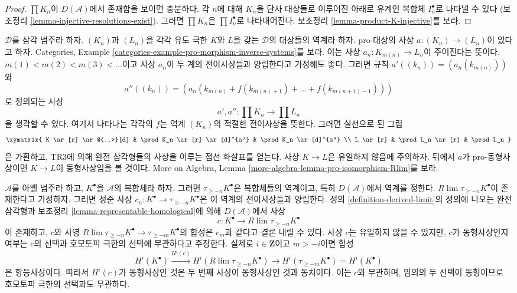 \begin{proof}
$\prod K_n$이 $D(\mathcal{A})$에서 존재함을 보이면 충분하다.
각 $n$에 대해 $K_n$을 단사 대상들로 이루어진 아래로 유계인 복합체
$I_n^\bullet$로 나타낼 수 있다
(보조정리 \ref{lemma-injective-resolutions-exist}). 그러면
$\prod K_n$은 $\prod I_n^\bullet$로 나타내어진다. 보조정리
\ref{lemma-product-K-injective}를 보라.
\end{proof}

\begin{remark}
\label{remark-functoriality-derived-limit}
$\mathcal{D}$를 삼각 범주라 하자. $(K_n)$과 $(L_n)$을 각각 유도 극한
$K$와 $L$을 갖는 $\mathcal{D}$의 대상들의 역계라 하자.
pro-대상의 사상 $a : (K_n) \to (L_n)$이 있다고 하자. Categories, Example
\ref{categories-example-pro-morphism-inverse-systems}를 보라.
이는 사상 $a_n : K_{m(n)} \to L_n$이 주어진다는 뜻이다.
$m(1) < m(2) < m(3) < \ldots$이고 사상 $a_n$이 두 계의 전이사상들과
양립한다고 가정해도 좋다. 그러면 규칙
$a'((k_n)) = (a_n(k_{m(n)}))$와
$$
a''((k_n)) =
(a_n(k_{m(n)} + f(k_{m(n) + 1}) + \ldots + f(k_{m(n + 1) - 1})))
$$
로 정의되는 사상
$$
a', a'' : \prod K_n \longrightarrow \prod L_n
$$
을 생각할 수 있다.
여기서 나타나는 각각의 $f$는 역계 $(K_n)$의 적절한 전이사상을 뜻한다.
그러면 실선으로 된 그림
$$
\xymatrix{
K \ar[r] \ar@{..>}[d] & \prod K_n \ar[r] \ar[d]^{a'} &
\prod K_n \ar[d]^{a''} \\
L \ar[r] & \prod L_n \ar[r] & \prod L_n
}
$$
은 가환하고, TR3에 의해 완전 삼각형들의 사상을 이루는 점선 화살표를
얻는다. 사상 $K \to L$은 유일하지 않음에 주의하자. 뒤에서 $a$가
pro-동형사상이면 $K \to L$이 동형사상임을 볼 것이다. More on Algebra,
Lemma \ref{more-algebra-lemma-pro-isomorphism-Rlim}를 보라.
\end{remark}

\begin{remark}
\label{remark-map-into-derived-limit-truncations}
$\mathcal{A}$를 아벨 범주라 하고, $K^\bullet$을 $\mathcal{A}$의
복합체라 하자.
그러면 $\tau_{\geq -n}K^\bullet$은 복합체들의 역계이고, 특히
$D(\mathcal{A})$에서 역계를 정한다. $R\lim \tau_{\geq -n}K^\bullet$이
존재한다고 가정하자. 그러면 정준 사상
$c_n : K^\bullet \to \tau_{\geq -n}K^\bullet$은 이 역계의
전이사상들과 양립한다. 정의 \ref{definition-derived-limit}의 정의에
나오는 완전 삼각형과 보조정리 \ref{lemma-representable-homological}에 의해
$D(\mathcal{A})$에서 사상
$$
c : K^\bullet \longrightarrow R\lim \tau_{\geq -n}K^\bullet
$$
이 존재하고, $c$와 사영
$R\lim \tau_{\geq -n}K^\bullet \to \tau_{\geq -m}K^\bullet$의 합성은
$c_m$과 같다고 결론 내릴 수 있다. 사상 $c$는 유일하지 않을 수 있지만,
$c$가 동형사상인지 여부는 $c$의 선택과 호모토피 극한의 선택에
무관하다고 주장한다. 실제로 $i \in \mathbf{Z}$이고 $m > -i$이면 합성
$$
H^i(K^\bullet) \xrightarrow{H^i(c)} H^i(R\lim \tau_{\geq -n}K^\bullet)
\to H^i(\tau_{\geq -m}K^\bullet) = H^i(K^\bullet)
$$
은 항등사상이다. 따라서 $H^i(c)$가 동형사상인 것은 두 번째 사상이
동형사상인 것과 동치이다. 이는 $c$와 무관하며, 임의의 두 선택이
동형이므로 호모토피 극한의 선택과도 무관하다.
\end{remark}

